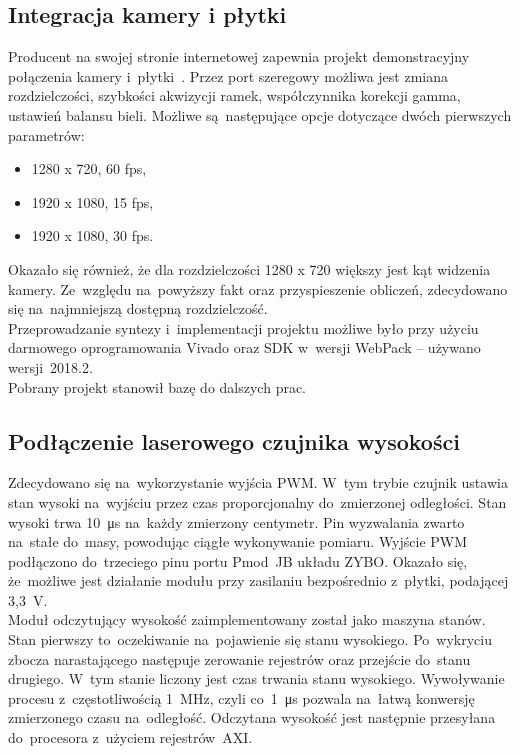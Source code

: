 \subsection{Integracja kamery i płytki}
\label{sec:integracja_uklad_kamera}
Producent na swojej stronie internetowej zapewnia projekt demonstracyjny połączenia kamery i~płytki~\cite{projektPCAM}. Przez port szeregowy możliwa jest zmiana rozdzielczości, szybkości akwizycji ramek, współczynnika korekcji gamma, ustawień balansu bieli. Możliwe są~następujące opcje dotyczące dwóch pierwszych parametrów:
\begin{itemize}
	\item 1280 x 720, 60 fps,
	\item 1920 x 1080, 15 fps,
	\item 1920 x 1080, 30 fps.
\end{itemize}
Okazało się również, że dla rozdzielczości 1280 x 720 większy jest kąt widzenia kamery. Ze~względu na~powyższy fakt oraz przyspieszenie obliczeń, zdecydowano się na~najmniejszą dostępną rozdzielczość.\\
Przeprowadzanie syntezy i~implementacji projektu możliwe było przy użyciu darmowego oprogramowania Vivado oraz SDK w~wersji WebPack -- używano wersji~2018.2. \\
Pobrany projekt stanowił bazę do dalszych prac.
\subsection{Podłączenie laserowego czujnika wysokości}
\label{subsec:podlaczenie_lasera}
Zdecydowano się na~wykorzystanie wyjścia PWM. W~tym trybie czujnik ustawia stan wysoki na~wyjściu przez czas proporcjonalny do~zmierzonej odległości. Stan wysoki trwa 10~\si{\micro\second} na~każdy zmierzony centymetr. Pin wyzwalania zwarto na~stałe do~masy, powodując ciągłe wykonywanie pomiaru. Wyjście PWM podłączono do~trzeciego pinu portu Pmod~JB układu ZYBO. Okazało się, że~możliwe jest działanie modułu przy zasilaniu bezpośrednio z~płytki, podającej 3,3~V.\\
Moduł odczytujący wysokość zaimplementowany został jako maszyna stanów. Stan pierwszy to~oczekiwanie na~pojawienie się stanu wysokiego. Po~wykryciu zbocza narastającego następuje zerowanie rejestrów oraz przejście do~stanu drugiego. W~tym stanie liczony jest czas trwania stanu wysokiego. Wywoływanie procesu z~częstotliwością 1~MHz, czyli co~1~\si{\micro\second} pozwala na~łatwą konwersję zmierzonego czasu na~odległość. Odczytana wysokość jest następnie przesyłana do~procesora z~użyciem rejestrów~AXI.
